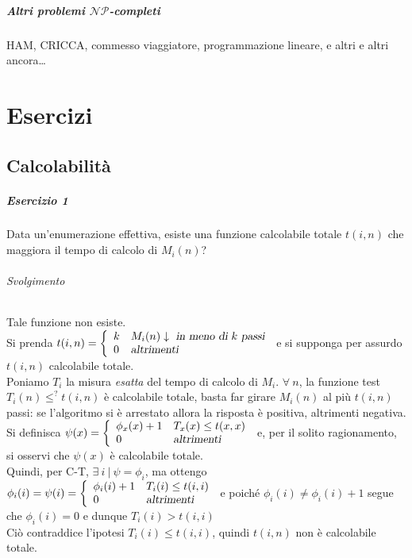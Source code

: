 \documentclass[10pt]{book}
\begin{document}
\paragraph{Altri problemi $\mathscr{NP}$-completi} HAM, CRICCA, commesso viaggiatore, programmazione lineare, e altri e altri ancora\ldots
\chapter{Esercizi}
\section{Calcolabilità}
\paragraph{Esercizio 1} Data un'enumerazione effettiva, esiste una funzione calcolabile totale $t(i,n)$ che maggiora il tempo di calcolo di $M_i(n)$?
\subparagraph{Svolgimento} Tale funzione non esiste.\\
Si prenda $t(i,n) = \left\{\begin{array}{l l}
	k&M_i(n)\downarrow\textsl{ in meno di }k\textsl{ passi}\\
	0&\textsl{altrimenti}
\end{array}\right.$ e si supponga per assurdo $t(i,n)$ calcolabile totale.\\
Poniamo $T_i$ la misura \textit{esatta} del tempo di calcolo di $M_i$. $\forall\:n$, la funzione test $T_i(n)\leq^?t(i,n)$ è calcolabile totale, basta far girare $M_i(n)$ al più $t(i,n)$ passi: se l'algoritmo si è arrestato allora la risposta è positiva, altrimenti negativa.\\
Si definisca $\psi(x) = \left\{\begin{array}{l l}
\phi_x(x) + 1&T_x(x)\leq t(x,x)\\
0&\textsl{altrimenti}
\end{array}\right.$ e, per il solito ragionamento, si osservi che $\psi(x)$ è calcolabile totale.\\
Quindi, per C-T, $\exists\:i\:|\:\psi = \phi_i$, ma ottengo $\phi_i(i) = \psi(i) = \left\{\begin{array}{l l}
\phi_i(i) + 1&T_i(i)\leq t(i,i)\\
0&\textsl{altrimenti}
\end{array}\right.$ e poiché $\phi_i(i)\neq\phi_i(i)+1$ segue che $\phi_i(i) = 0$ e dunque $T_i(i) > t(i,i)$\\
Ciò contraddice l'ipotesi $T_i(i)\leq t(i,i)$, quindi $t(i,n)$ non è calcolabile totale.
\end{document}
